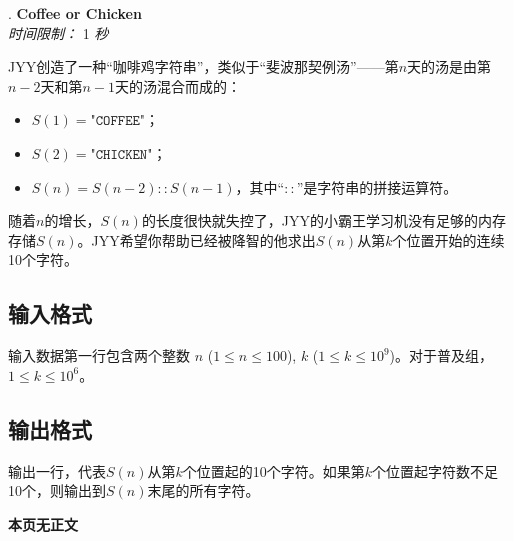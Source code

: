 \addtocounter{ProblemNo}{1}
\renewcommand{\ProblemName}{Coffee or Chicken}
\begin{center}
\huge{. \textbf{\ProblemName}} \\ [0.8cm]
\large{\textit{时间限制：} 1 \textit{秒}} \\ [1cm]
\end{center}

JYY创造了一种“咖啡鸡字符串”，类似于“斐波那契例汤”——第$n$天的汤是由第$n-2$天和第$n-1$天的汤混合而成的：

\begin{itemize}
  \item $S(1) = \texttt{"COFFEE"}$；
  \item $S(2) = \texttt{"CHICKEN"}$；
  \item $S(n) = S(n - 2) :: S(n - 1)$，其中“$::$”是字符串的拼接运算符。
\end{itemize}

随着$n$的增长，$S(n)$的长度很快就失控了，JYY的小霸王学习机没有足够的内存存储$S(n)$。JYY希望你帮助已经被降智的他求出$S(n)$从第$k$个位置开始的连续10个字符。

\subsection*{输入格式}

输入数据第一行包含两个整数 $n$ ($1\le n\le 100$), $k$ ($1\le k\le 10^9$)。对于普及组，$1\le k\le 10^6$。

\subsection*{输出格式}

输出一行，代表$S(n)$从第$k$个位置起的10个字符。如果第$k$个位置起字符数不足10个，则输出到$S(n)$末尾的所有字符。

\setcounter{ExampleNo}{0}


\clearpage

\ifodd\value{page}
\else
    \vspace*{\fill}
    \begin{center}
    \textbf{\Large 本页无正文}
    \end{center}
    \vspace*{\fill}
    \clearpage
\fi

